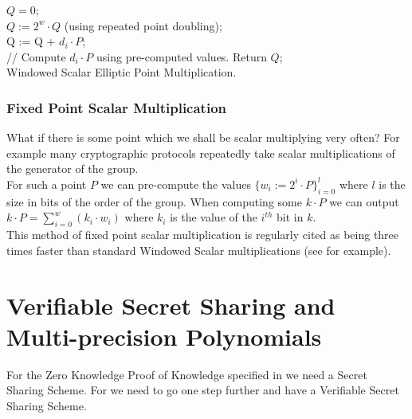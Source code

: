 \documentclass[ %
                    author={Nicholas Tutte},
                supervisor={Prof. Nigel Smart},
                    degree={MEng},
                     title={Secure Two Party Computation},
                  subtitle={A practical comparison of recent protocols},
                      type={Research - GG1K},
                      year={2015} ]{dissertation}
\begin{document}
\begin{appendices}
					\begin{mdframed}
						\begin{algorithm}[H]
							$Q = 0$;\\[0.25cm]
							{
								$Q := 2^w \cdot Q$ (using repeated point doubling);\\[0.25cm]
								{
									Q := Q + $d_i \cdot P$;\\[0.25cm]
									// Compute $d_i \cdot P$ using pre-computed values.
								}
							}
							Return $Q$;\\[0.25cm]

							\caption{Windowed Scalar Elliptic Point Multiplication.}
						\end{algorithm}

					\end{mdframed}

					\subsubsection{Fixed Point Scalar Multiplication}
						What if there is some point which we shall be scalar multiplying very often? For example many cryptographic protocols repeatedly take scalar multiplications of the generator of the group.\\

						For such a point $P$ we can pre-compute the values $\{w_i := 2^i \cdot P\}_{i = 0}^{l}$ where $l$ is the size in bits of the order of the group. When computing some $k \cdot P$ we can output $k \cdot P = \sum_{i = 0}^{w} (k_i \cdot w_i)$ where $k_i$ is the value of the $i^{th}$ bit in $k$.\\

						This method of fixed point scalar multiplication is regularly cited as being three times faster than standard Windowed Scalar multiplications (see \cite{LindellPinkasSmart2008} for example).


			\section{Verifiable Secret Sharing and Multi-precision Polynomials}

				For the Zero Knowledge Proof of Knowledge specified in \cite{LindellAndPinkas2011} we need a Secret Sharing Scheme. For \cite{Katz_Symm_CnC_2013} we need to go one step further and have a Verifiable Secret Sharing Scheme.\\


\end{appendices}
\end{document}
